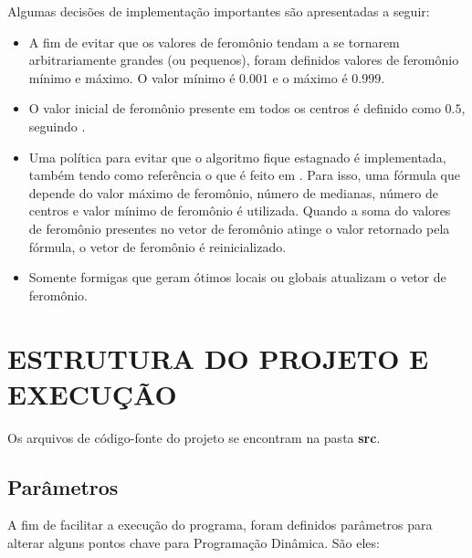 \documentclass[12pt]{article}
\begin{document}
Algumas decisões de implementação importantes são apresentadas a seguir:

\begin{itemize}
 \item A fim de evitar que os valores de feromônio tendam a se tornarem arbitrariamente grandes 
 (ou pequenos), foram definidos valores de feromônio mínimo e máximo. O valor mínimo é $ 0.001 $
 e o máximo é $ 0.999 $.
 
 \item O valor inicial de feromônio presente em todos os centros é definido como $ 0.5 $, seguindo
 \cite{dblp:fr}.
 
 \item Uma política para evitar que o algoritmo fique estagnado é implementada, também tendo como 
 referência o que é feito em \cite{dblp:fr}. Para isso, uma fórmula
 que depende do valor máximo de feromônio, número de medianas, número de centros e valor mínimo de
 feromônio é utilizada. Quando a soma do valores de feromônio presentes no vetor de feromônio atinge
 o valor retornado pela fórmula, o vetor de feromônio é reinicializado.
 
 \item Somente formigas que geram ótimos locais ou globais atualizam o vetor de feromônio.
 
\end{itemize}

\section{ESTRUTURA DO PROJETO E EXECUÇÃO}

Os arquivos de código-fonte do projeto se encontram na pasta \textbf{src}. 

\subsection{Parâmetros}

A fim de facilitar a execução do programa, foram definidos parâmetros para alterar 
alguns pontos chave para Programação Dinâmica. São eles:
\end{document}
